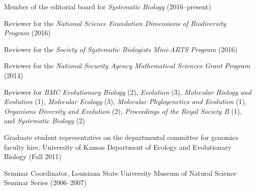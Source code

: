 \myHangIndent
Member of the editorial board for \emph{Systematic Biology} (2016--present)

\myHangIndent
Reviewer for the
    \emph{National Science Foundation Dimensions of Biodiversity Program} (2016)

\myHangIndent
Reviewer for the
    \emph{Society of Systematic Biologists Mini-ARTS Program} (2016)

\myHangIndent
Reviewer for the
    \emph{National Security Agency Mathematical Sciences Grant Program} (2014)


\myHangIndent
Reviewer for
    \emph{BMC Evolutionary Biology} (2),
    \emph{Evolution} (3),
    \emph{Molecular Biology and Evolution} (1),
    \emph{Molecular Ecology} (3),
    \emph{Molecular Phylogenetics and Evolution} (1),
    \emph{Organisms Diversity and Evolution} (2),
    \emph{Proceedings of the Royal Society B} (1),
    and
    \emph{Systematic Biology} (2)

\myHangIndent
Graduate student representative on the departmental committee for
    genomics faculty hire, University of Kansas Department of Ecology and
    Evolutionary Biology (Fall 2011)

\myHangIndent
Seminar Coordinator, Louisiana State University Museum of Natural Science
    Seminar Series (2006--2007)


